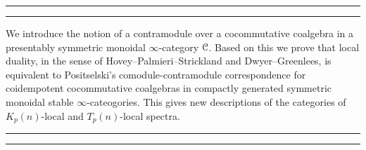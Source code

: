 

\vspace*{5cm}

{\par{}\par}
\vspace{-2em}
\rule[-11pt]{\textwidth}{1pt}
\rule{\textwidth}{0.5pt}
    
We introduce the notion of a contramodule over a cocommutative coalgebra in a presentably symmetric monoidal $\infty$-category $\EuScript{C}$. Based on this we prove that local duality, in the sense of Hovey--Palmieri--Strickland and Dwyer--Greenlees, is equivalent to Positselski's comodule-contramodule correspondence for coidempotent cocommutative coalgebras in compactly generated symmetric monoidal stable $\infty$-cateogories. This gives new descriptions of the categories of $K_p(n)$-local and $T_p(n)$-local spectra. 

\rule{\textwidth}{0.5pt}
\rule[11pt]{\textwidth}{1pt}
\vspace{\fill}

